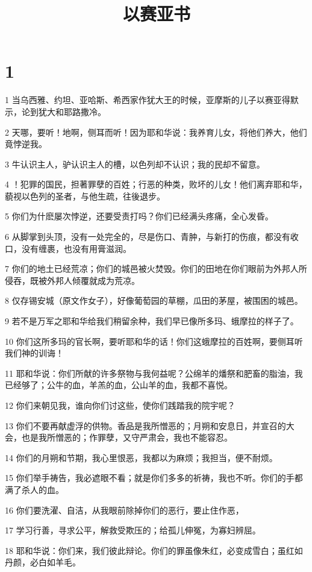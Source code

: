 

\title{以赛亚书}


\chapter{1}

\par 1 当乌西雅、约坦、亚哈斯、希西家作犹大王的时候，亚摩斯的儿子以赛亚得默示，论到犹大和耶路撒冷。
\par 2 天哪，要听！地啊，侧耳而听！因为耶和华说：我养育儿女，将他们养大，他们竟悖逆我。
\par 3 牛认识主人，驴认识主人的槽，以色列却不认识；我的民却不留意。
\par 4 ！犯罪的国民，担著罪孽的百姓；行恶的种类，败坏的儿女！他们离弃耶和华，藐视以色列的圣者，与他生疏，往後退步。
\par 5 你们为什麽屡次悖逆，还要受责打吗？你们已经满头疼痛，全心发昏。
\par 6 从脚掌到头顶，没有一处完全的，尽是伤口、青肿，与新打的伤痕，都没有收口，没有缠裹，也没有用膏滋润。
\par 7 你们的地土已经荒凉；你们的城邑被火焚毁。你们的田地在你们眼前为外邦人所侵吞，既被外邦人倾覆就成为荒凉。
\par 8 仅存锡安城（原文作女子），好像葡萄园的草棚，瓜田的茅屋，被围困的城邑。
\par 9 若不是万军之耶和华给我们稍留余种，我们早已像所多玛、蛾摩拉的样子了。
\par 10 你们这所多玛的官长啊，要听耶和华的话！你们这蛾摩拉的百姓啊，要侧耳听我们神的训诲！
\par 11 耶和华说：你们所献的许多祭物与我何益呢？公绵羊的燔祭和肥畜的脂油，我已经够了；公牛的血，羊羔的血，公山羊的血，我都不喜悦。
\par 12 你们来朝见我，谁向你们讨这些，使你们践踏我的院宇呢？
\par 13 你们不要再献虚浮的供物。香品是我所憎恶的；月朔和安息日，并宣召的大会，也是我所憎恶的；作罪孽，又守严肃会，我也不能容忍。
\par 14 你们的月朔和节期，我心里恨恶，我都以为麻烦；我担当，便不耐烦。
\par 15 你们举手祷告，我必遮眼不看；就是你们多多的祈祷，我也不听。你们的手都满了杀人的血。
\par 16 你们要洗濯、自洁，从我眼前除掉你们的恶行，要止住作恶，
\par 17 学习行善，寻求公平，解救受欺压的；给孤儿伸冤，为寡妇辨屈。
\par 18 耶和华说：你们来，我们彼此辩论。你们的罪虽像朱红，必变成雪白；虽红如丹颜，必白如羊毛。
